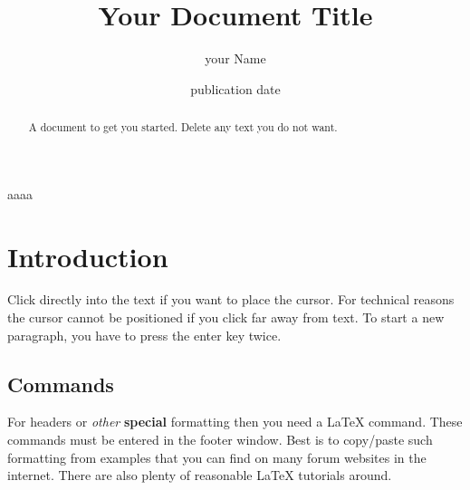 \documentclass[a4paper, 11pt]{article}
\title{Your Document Title}
\author{your Name}
\date{publication date}
\begin{document}

\begin{text}
aaaa
\end{text}
\maketitle

\begin{abstract}
A document to get you started. Delete any text you do not want.
\end{abstract}

\section{Introduction}
Click directly into the text if you want to place the cursor. For technical reasons the cursor cannot be positioned if you click far away from text.  To start a new paragraph, you have to press the enter key twice.

\subsection{Commands}

For headers or \emph{other} \textbf{special} formatting then you need a  \LaTeX\xspace command. These commands must be entered in the footer window. Best is to copy/paste such formatting from examples that you can find on many forum websites in the internet. There are also plenty of reasonable  \LaTeX\xspace tutorials around.


\end{document}
